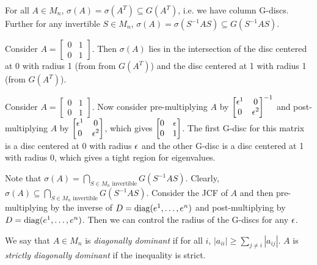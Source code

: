 \begin{note*}
For all $A \in M_n$, $\sigma(A) = \sigma(A^T) \subseteq G(A^T)$, i.e. we have column G-discs. Further for any invertible $S \in M_n$, $\sigma(A) = \sigma(S^{-1}AS) \subseteq G(S^{-1}AS)$.
\end{note*}

\begin{example}
Consider $A = \begin{bmatrix}0 & 1\\0 & 1\end{bmatrix}$. Then $\sigma(A)$ lies in the intersection of the disc centered at 0 with radius 1 (from from $G(A^T)$) and the disc centered at 1 with radius 1 (from $G(A^T)$).
\end{example}

\begin{example}
Consider $A = \begin{bmatrix}0 & 1\\0 & 1\end{bmatrix}$. Now consider pre-multiplying $A$ by $\begin{bmatrix}\epsilon^1 & 0 \\ 0 & \epsilon^2\end{bmatrix}^{-1}$ and post-multiplying $A$ by $\begin{bmatrix}\epsilon^1 & 0 \\ 0 & \epsilon^2\end{bmatrix}$, which gives $ \begin{bmatrix}0 & \epsilon\\0 & 1\end{bmatrix}$. The first G-disc for this matrix is a disc centered at 0 with radius $\epsilon$ and the other G-disc is a disc centered at 1 with radius 0, which gives a tight region for eigenvalues.
\end{example}

\begin{example}
Note that $\sigma(A) = \bigcap_{S\in M_n \text{ invertible}} G(S^{-1}AS)$. Clearly, $\sigma(A) \subseteq \bigcap_{S\in M_n \text{ invertible}} G(S^{-1}AS)$. Consider the JCF of $A$ and then pre-multiplying by the inverse of $D = \operatorname{diag}(e^1, \dots, e^n)$ and post-multiplying by $D = \operatorname{diag}(e^1, \dots, e^n)$. Then we can control the radius of the G-discs for any $\epsilon$.
\end{example}

\begin{definition}
\label{def:diagonally-dominant}
We say that $A \in M_n$ is \textit{diagonally dominant} if for all $i$, $|a_{ii}| \ge \sum_{j \not=i} |a_{ij}|$. $A$ is \textit{strictly diagonally dominant} if the inequality is strict.
\end{definition}

